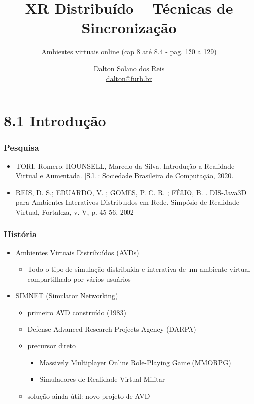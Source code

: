 \documentclass{beamer}
\title[XR Distribuído – Técnicas de Sincronização]{XR Distribuído – Técnicas de Sincronização}
\subtitle{Ambientes virtuais online (cap 8 até 8.4 - pag. 120 a 129)}
\author[Dalton Solano dos Reis]{
  Dalton Solano dos Reis\texorpdfstring{\\\medskip}{}%
  {\small \href{mailto:dalton@furb.br}{dalton@furb.br}}}
\institute[UDESC]{
  Centro de Ciências e Tecnológicas\\
  Universidade do Estado de Santa Catarina}
\begin{document}
\begin{frame}
  \titlepage

\end{frame}

\section{8.1 Introdução}

\begin{frame}
  \frametitle{Pesquisa}
  \begin{itemize}
    \item TORI, Romero; HOUNSELL, Marcelo da Silva. Introdução a Realidade Virtual e Aumentada. [S.l.]: Sociedade Brasileira de Computação, 2020. 
    \item REIS, D. S.; EDUARDO, V. ; GOMES, P. C. R. ; FÉIJO, B. . DIS-Java3D para Ambientes Interativos Distribuídos em Rede. Simpósio de Realidade Virtual, Fortaleza, v. V, p. 45-56, 2002
  \end{itemize}
\end{frame}

\begin{frame}
  \frametitle{História}
    \begin{itemize}
      \item Ambientes Virtuais Distribuídos (AVDs)
      \begin{itemize}
        \item Todo o tipo de simulação distribuída e interativa de um ambiente virtual compartilhado por vários usuários
      \end{itemize}
      \item SIMNET (Simulator Networking)
      \begin{itemize}
        \item primeiro AVD construído (1983)
        \item Defense Advanced Research Projects Agency (DARPA)
        \item precursor direto
        \begin{itemize}
          \item Massively Multiplayer Online Role-Playing Game (MMORPG)
          \item Simuladores de Realidade Virtual Militar
        \end{itemize}
        \item solução ainda útil: novo projeto de AVD
      \end{itemize} 
    \end{itemize}
\end{frame}
\end{document}
